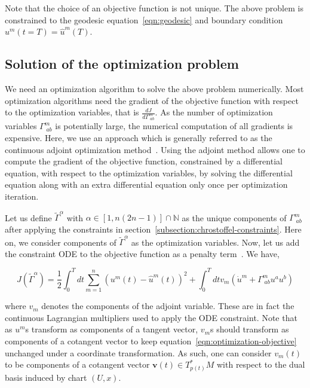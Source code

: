 \documentclass[a4paper,11pt]{elsarticle}
\begin{document}
Note that the choice of an objective function is not unique. The above
problem is constrained to the geodesic equation~\ref{eqn:geodesic} and
boundary condition $u^{m}(t = T) = \hat{u}^{m}(T)$.

\subsection{Solution of the optimization problem}
\label{subsection:adjoint-method}

We need an optimization algorithm to solve the above problem
numerically. Most optimization algorithms need the gradient of the
objective function with respect to the optimization variables, that is
$\frac{dJ}{d \Gamma^{m}_{\;ab}}$. As the number of optimization
variables $\Gamma^{m}_{\;ab}$ is potentially large, the numerical
computation of all gradients is expensive. Here, we use an approach
which is generally referred to as the continuous adjoint optimization
method~\cite{adjoint-giles}. Using the adjoint method allows one
to compute the gradient of the objective function, constrained by a
differential equation, with respect to the optimization variables, by
solving the differential equation along with an extra differential
equation only once per optimization iteration.

Let us define $\tilde{\Gamma}^{\alpha}$ with $\alpha \in [1,n(2n-1)]
\cap \mathbb{N}$ as the unique components of $\Gamma^{m}_{\;ab}$ after
applying the constraints in
section~\ref{subsection:chrostoffel-constraints}. Here on, we consider
components of $\tilde{\Gamma}^{\alpha}$ as the optimization
variables. Now, let us add the constraint ODE to the objective function as
a penalty term~\cite{adjoint-giles}. We have,

\begin{equation}\label{eqn:optimization-objective}
J(\tilde{\Gamma}^{\alpha}) = \frac{1}{2} \int_{0}^{T} dt
\sum_{m=1}^{n} (u^{m}(t) - \hat{u}^{m}(t))^2 + \int_{0}^{T} dt v_{m}
\left( \dot{u}^{m} + \Gamma^{m}_{\;ab} u^{a} u^{b} \right)
\end{equation}

where $v_{m}$ denotes the components of the adjoint variable. These
are in fact the continuous Lagrangian multipliers used to apply the
ODE constraint. Note that as $u^{m}$s transform as components of a
tangent vector, $v_{m}$s should transform as components of a cotangent
vector to keep equation~\ref{eqn:optimization-objective} unchanged
under a coordinate transformation. As such, one can consider
$v_{m}(t)$ to be components of a cotangent vector $\boldsymbol{v}(t)
\in T^{*}_{p(t)}M$ with respect to the dual basis induced by chart
$(U, x)$.
\end{document}
